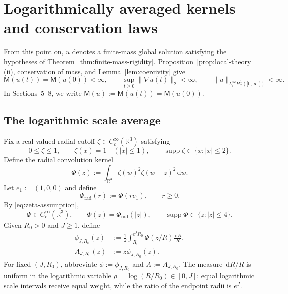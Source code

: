 \documentclass{interact}
\numberwithin{equation}{section}
\theoremstyle{plain}
\theoremstyle{definition}
\theoremstyle{remark}
\newcommand{\R}{\mathbb R}
\newcommand{\supp}{\operatorname{supp}}
\newcommand{\M}{\mathsf M}
\newcommand{\dd}{\,\mathrm d}
\begin{document}
\section{Logarithmically averaged kernels and conservation laws}

From this point on, $u$ denotes a finite-mass global solution satisfying the hypotheses of Theorem~\ref{thm:finite-mass-rigidity}. Proposition~\ref{prop:local-theory}(ii), conservation of mass, and Lemma~\ref{lem:coercivity} give
\begin{equation}\label{eq:global-H1-budget}
 \M(u(t))=\M(u(0))<\infty,
 \qquad
 \sup_{t\ge0}\|\nabla u(t)\|_2<\infty,
 \qquad
 \|u\|_{L_t^\infty H_x^1([0,\infty))}<\infty.
\end{equation}
In Sections~5--8, we write $\M(u):=\M(u(t))=\M(u(0))$.

\subsection{The logarithmic scale average}

Fix a real-valued radial cutoff $\zeta\in C_c^\infty(\R^3)$ satisfying
\begin{equation}\label{eq:zeta-assumption}
 0\le\zeta\le1,
 \qquad
 \zeta(x)=1\quad(|x|\le1),
 \qquad
 \supp\zeta\subset\{x:|x|\le2\}.
\end{equation}
Define the radial convolution kernel
\begin{equation}\label{eq:Phi-def}
 \Phi(z):=\int_{\R^3}\zeta(w)^2\zeta(w-z)^2\dd w.
\end{equation}
Let $e_1:=(1,0,0)$ and define
\begin{equation}\label{eq:Phi-radial-profile}
 \Phi_{\mathrm{rad}}(r):=\Phi(re_1),
 \qquad r\ge0.
\end{equation}
By \eqref{eq:zeta-assumption},
\begin{equation}\label{eq:Phi-properties}
 \Phi\in C_c^\infty(\R^3),
 \qquad
 \Phi(z)=\Phi_{\mathrm{rad}}(|z|),
 \qquad
 \supp\Phi\subset\{z:|z|\le4\}.
\end{equation}
Given $R_0>0$ and $J\ge1$, define
\begin{align}
 \phi_{J,R_0}(z)
 &:=\frac1J\int_{R_0}^{e^JR_0}
 \Phi(z/R)\frac{\dd R}{R},
 \label{eq:phi-def}\\
 A_{J,R_0}(z)&:=z\phi_{J,R_0}(z).
 \label{eq:A-def}
\end{align}
For fixed $(J,R_0)$, abbreviate $\phi:=\phi_{J,R_0}$ and $A:=A_{J,R_0}$. The measure $\dd R/R$ is uniform in the logarithmic variable $\rho=\log(R/R_0)\in[0,J]$: equal logarithmic scale intervals receive equal weight, while the ratio of the endpoint radii is $e^J$.
\end{document}

